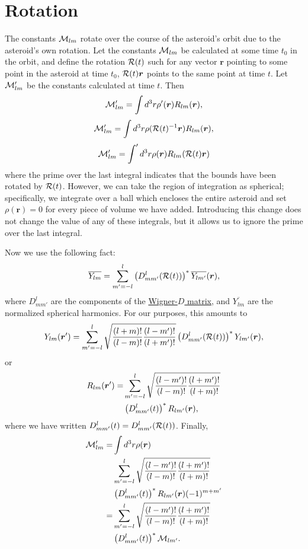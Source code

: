 \documentclass[aps,twocolumn,secnumarabic,balancelastpage,amsmath,amssymb,nofootinbib,floatfix]{revtex4-1}
\begin{document}
\section{Rotation}
The constants $\mathcal{M}_{lm}$ rotate over the course of the asteroid's orbit due to the asteroid's own rotation. Let the constants $\mathcal{M}_{lm}$ be calculated at some time $t_0$ in the orbit, and define the rotation $\mathcal{R}(t)$ such for any vector $\bm r$ pointing to some point in the asteroid at time $t_0$, $\mathcal{R}(t) \bm r$ points to the same point at time $t$. Let $\mathcal{M}'_{lm}$ be the constants calculated at time $t$. Then
$$\mathcal{M}'_{lm} = \int d^3 r \rho'(\bm r) R_{lm}(\bm r),$$
$$\mathcal{M}'_{lm} = \int d^3 r \rho(\mathcal{R}(t)^{-1}\bm r) R_{lm}(\bm r),$$
$$\mathcal{M}'_{lm} = \int' d^3 r \rho(\bm r) R_{lm}(\mathcal{R}(t) \bm r)$$
where the prime over the last integral indicates that the bounds have been rotated by $\mathcal{R}(t)$. However, we can take the region of integration as spherical; specifically, we integrate over a ball which encloses the entire asteroid and set $\rho(\bm r)=0$ for every piece of volume we have added. Introducing this change does not change the value of any of these integrals, but it allows us to ignore the prime over the last integral.

Now we use the following fact:
$$\overline{Y_{lm}} = \sum_{m'=-l}^l\left( D^l_{mm'}(\mathcal{R}(t)) \right)^*\overline{Y_{lm'}}(\bm r),$$
where $D^l_{mm'}$ are the components of the \href{https://en.wikipedia.org/wiki/Wigner_D-matrix#Relation_to_spherical_harmonics_and_Legendre_polynomials}{Wigner-$D$ matrix}, and $\overline{Y_{lm}}$ are the normalized spherical harmonics. For our purposes, this amounts to
$$Y_{lm}(\bm r') = \sum_{m'=-l}^l\sqrt{\frac{(l+m)!}{(l-m)!}\frac{(l-m')!}{(l+m')!}}\left( D^l_{mm'}(\mathcal{R}(t)) \right)^*Y_{lm'}(\bm r),$$
or
\begin{equation*}
\begin{aligned}
R_{lm}(\bm r') = &\sum_{m'=-l}^l\sqrt{\frac{(l-m')!}{(l-m)!}\frac{(l+m')!}{(l+m)!}}\\
&\left( D^l_{mm'}(t) \right)^*R_{lm'}(\bm r),
\end{aligned}
\end{equation*}
where we have written $D^l_{mm'}(t)=D^l_{mm'}(\mathcal{R}(t))$. Finally,
\begin{equation*}
\begin{aligned}
\mathcal{M}'_{lm} =& \int d^3 r \rho(\bm r) \\
&\sum_{m'=-l}^l\sqrt{\frac{(l-m')!}{(l-m)!}\frac{(l+m')!}{(l+m)!}}\\
&\left( D^l_{mm'}(t) \right)^*R_{lm'}(\bm r)(-1)^{m+m'}\\
=&\sum_{m'=-l}^l\sqrt{\frac{(l-m')!}{(l-m)!}\frac{(l+m')!}{(l+m)!}}\\
&\left( D^l_{mm'}(t) \right)^*\mathcal{M}_{lm'}.
\end{aligned}
\end{equation*}
\end{document}
